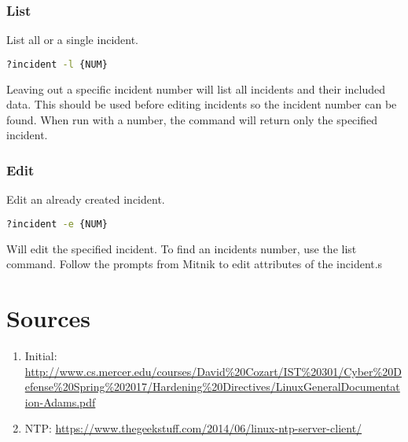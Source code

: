 \documentclass{article}
\begin{document}
\subsubsection{List}
List all or a single incident.

\begin{lstlisting}[language=bash]
?incident -l {NUM}
\end{lstlisting}

Leaving out a specific incident number will list all incidents and their included data. This should be used before editing incidents so the incident number can be found. When run with a number, the command will return only the specified incident.

\subsubsection{Edit}
Edit an already created incident.

\begin{lstlisting}[language=bash]
?incident -e {NUM}
\end{lstlisting}

Will edit the specified incident. To find an incidents number, use the list command. Follow the prompts from Mitnik to edit attributes of the incident.s


\section{Sources}
\begin{enumerate}
    \item Initial: \url{http://www.cs.mercer.edu/courses/David%20Cozart/IST%20301/Cyber%20Defense%20Spring%202017/Hardening%20Directives/LinuxGeneralDocumentation-Adams.pdf} 
   	\item NTP:
   	\url{https://www.thegeekstuff.com/2014/06/linux-ntp-server-client/}
\end{enumerate}
\end{document}

